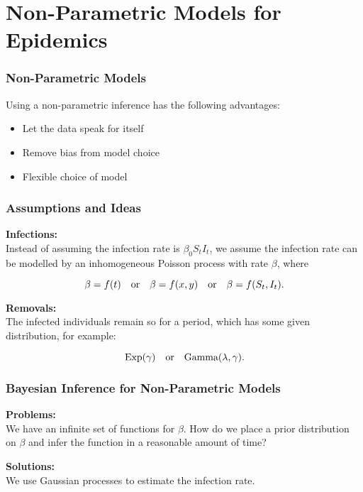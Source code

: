 \documentclass[demo]{beamer}
\begin{document}
\section{Non-Parametric Models for Epidemics}
\begin{frame}
	\frametitle{Non-Parametric Models}
	Using a non-parametric inference has the following advantages:
	\vspace{1em}
	\begin{itemize}
	\setlength\itemsep{1em}
		\item Let the data speak for itself
		\item Remove bias from model choice
		\item Flexible choice of model
	\end{itemize}
\end{frame}


\begin{frame}
	\frametitle{Assumptions and Ideas}

\textbf{Infections:}\\
Instead of assuming the infection rate is $\beta_0 S_t I_t$, we assume the infection rate can be modelled by an inhomogeneous Poisson process with rate $\beta$, where 

$$
\beta = f(t) \quad \hbox{or} \quad \beta = f(x, y) \quad \hbox{or} \quad \beta = f(S_t, I_t).
$$



\textbf{Removals:}\\
The infected individuals remain so for a period, which has some given distribution, for example:

$$
\hbox{Exp}(\gamma) \quad \hbox{or} \quad \hbox{Gamma}(\lambda, \gamma).
$$

\end{frame}


\begin{frame}
	\frametitle{Bayesian Inference for Non-Parametric Models}
\textbf{Problems:} \\
We have an infinite set of functions for $\beta$. How do we place a prior distribution on $\beta$ and infer the function in a reasonable amount of time?
\vspace{1em}

\textbf{Solutions:}\\
We use Gaussian processes to estimate the infection rate.  

\end{frame}
\end{document}
